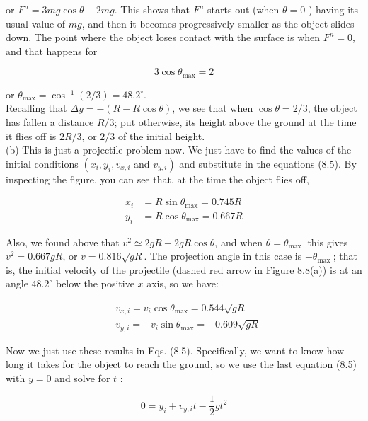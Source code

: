 \documentclass[10pt]{article}
\begin{document}
or $F^{n}=3 m g \cos \theta-2 m g$. This shows that $F^{n}$ starts out (when $\theta=0$ ) having its usual value of $m g$, and then it becomes progressively smaller as the object slides down. The point where the object loses contact with the surface is when $F^{n}=0$, and that happens for


\begin{equation*}
3 \cos \theta_{\max }=2 \tag{8.50}
\end{equation*}


or $\theta_{\max }=\cos ^{-1}(2 / 3)=48.2^{\circ}$.\\
Recalling that $\Delta y=-(R-R \cos \theta)$, we see that when $\cos \theta=2 / 3$, the object has fallen a distance $R / 3$; put otherwise, its height above the ground at the time it flies off is $2 R / 3$, or $2 / 3$ of the initial height.\\
(b) This is just a projectile problem now. We just have to find the values of the initial conditions $\left(x_{i}, y_{i}, v_{x, i}\right.$ and $\left.v_{y, i}\right)$ and substitute in the equations (8.5). By inspecting the figure, you can see that, at the time the object flies off,


\begin{align*}
x_{i} & =R \sin \theta_{\max }=0.745 R \\
y_{i} & =R \cos \theta_{\max }=0.667 R \tag{8.51}
\end{align*}


Also, we found above that $v^{2} \simeq 2 g R-2 g R \cos \theta$, and when $\theta=\theta_{\text {max }}$ this gives $v^{2}=0.667 g R$, or $v=0.816 \sqrt{g R}$. The projection angle in this case is $-\theta_{\text {max }}$; that is, the initial velocity of the projectile (dashed red arrow in Figure 8.8(a)) is at an angle $48.2^{\circ}$ below the positive $x$ axis, so we have:


\begin{align*}
& v_{x, i}=v_{i} \cos \theta_{\max }=0.544 \sqrt{g R} \\
& v_{y, i}=-v_{i} \sin \theta_{\max }=-0.609 \sqrt{g R} \tag{8.52}
\end{align*}


Now we just use these results in Eqs. (8.5). Specifically, we want to know how long it takes for the object to reach the ground, so we use the last equation (8.5) with $y=0$ and solve for $t$ :


\begin{equation*}
0=y_{i}+v_{y, i} t-\frac{1}{2} g t^{2} \tag{8.53}
\end{equation*}
\end{document}
